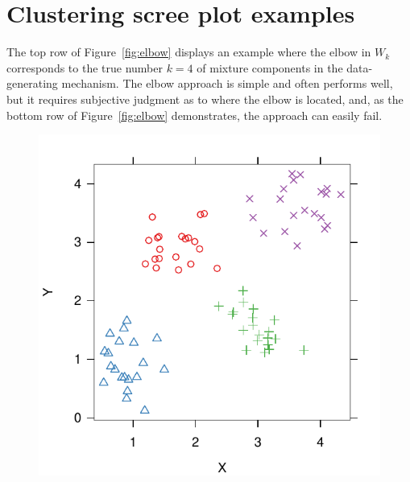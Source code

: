 \documentclass[12pt]{article}
\begin{document}
\section{Clustering scree plot examples}

\label{sec:elbow-fail}

The top row of Figure~\ref{fig:elbow}
displays an example where the elbow in $W_k$ corresponds to the true number $k
= 4$ of mixture components in the data-generating mechanism. The elbow
approach is simple and often performs well, but it requires subjective
judgment as to where the elbow is located, and, as the bottom row of
Figure~\ref{fig:elbow} demonstrates, the approach can easily fail.

\begin{figure}
\centering
\begin{minipage}{\linewidth}
  \begin{minipage}{0.45\linewidth}
    \includegraphics[width=\linewidth]{main_code/demo/elbow/correct-data.pdf}
  \end{minipage}
  \hspace{0.05in}
  \begin{minipage}{0.45\linewidth}

\end{minipage}
\end{minipage}
\end{figure}
\end{document}
